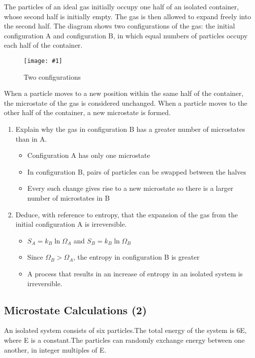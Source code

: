 \documentclass[a4paper,12pt]{article}
\newcommand{\img}[4]{\begin{center}
  \begin{figure}[H]
    \centering
    \texttt{[image: \#1]}
    \caption{#3}
    \label{fig:#4}
  \end{figure}
\end{center}}
\begin{document}
The particles of an ideal gas initially occupy one half of an isolated container, whose second half is
initially empty. The gas is then allowed to expand freely into the second half. The diagram shows two
configurations of the gas: the initial configuration A and configuration B, in which equal numbers of
particles occupy each half of the container.
\img{ex/2.png}{0.5}{Two configurations}{ex2}
When a particle moves to a new position within the same half of the container, the microstate of the gas is
considered unchanged. When a particle moves to the other half of the container, a new microstate is
formed.
\begin{enumerate}[label=(\alph*)]
  \item Explain why the gas in configuration B has a greater number of microstates than in A.
        \begin{itemize}
          \item Configuration A has only one microstate
          \item In configuration B, pairs of particles can be swapped between the halves
          \item Every such change gives rise to a new microstate so there is a larger number of microstates in B
        \end{itemize}
  \item Deduce, with reference to entropy, that the expansion of the gas from the initial configuration A is irreversible.
        \begin{itemize}
          \item $S_A = k_B \ln \Omega_A$ and $S_B = k_B \ln \Omega_B$
          \item Since $\Omega_B > \Omega_A$, the entropy in configuration B is greater
          \item A process that results in an increase of entropy in an isolated system is irreversible.
        \end{itemize}

\end{enumerate}
\pagebreak

\subsection{Microstate Calculations (2)}

An isolated system consists of six particles.The total energy of the system is 6E, where E is a constant.The
particles can randomly exchange energy between one another, in integer multiples of E.
\end{document}
